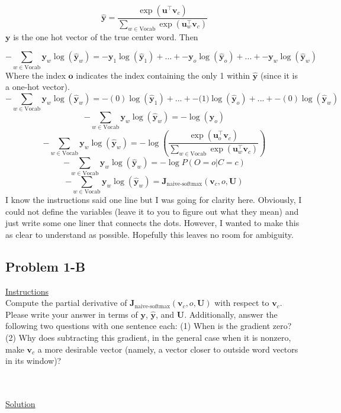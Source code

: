 \documentclass[12pt]{article}
\begin{document}
\begin{equation*}
    \hat{\bm y} = 
    \frac{\exp(\bm u^\top \bm v_c)}{\sum_{w \in \text{Vocab}} \exp(\bm u_{w}^\top \bm v_c)}
\end{equation*}
$\bm y$ is the one hot vector of the true center word. Then

\begin{equation*} 
    -\sum_{w \in \text{Vocab}} \bm y_w \log(\hat{\bm y}_w) = 
    \bm -\bm y_1 \log(\hat{\bm y}_1) + ... + -\bm y_o \log(\hat{\bm y}_o) + ... + -\bm y_w \log(\hat{\bm y}_w)
\end{equation*}    
Where the index $\bm o$ indicates the index containing the only 1 within $\hat {\bm y}$ (since it is a one-hot vector). 
\begin{equation*} 
    -\sum_{w \in \text{Vocab}} \bm y_w \log(\hat{\bm y}_w) = 
    \bm - (0)\log(\hat{\bm y}_1) + ... + -\bm (1) \log(\hat{\bm y}_o) + ... + - (0) \log(\hat{\bm y}_w)
\end{equation*}    
\begin{equation*} 
    -\sum_{w \in \text{Vocab}} \bm y_w \log(\hat{\bm y}_w) = 
    -\log(\hat{\bm y}_o)
\end{equation*}    
\begin{equation*} 
    -\sum_{w \in \text{Vocab}} \bm y_w \log(\hat{\bm y}_w) = 
    - \log(\frac{\exp(\bm u_o^\top \bm v_c)}{\sum_{w \in \text{Vocab}} \exp(\bm u_{w}^\top \bm v_c)})
\end{equation*}    
\begin{equation*} 
    -\sum_{w \in \text{Vocab}} \bm y_w \log(\hat{\bm y}_w) = 
    - \log P(O=o| C=c)
\end{equation*}   
\begin{equation*} 
    -\sum_{w \in \text{Vocab}} \bm y_w \log(\hat{\bm y}_w) = 
    \bm J_{\text{naive-softmax}}(\bm v_c, o, \bm U)
\end{equation*}     
I know the instructions said one line but I was going for clarity here. Obviously, I could not define
the variables (leave it to you to figure out what they mean) and just write some 
one liner that connects the dots. However, I wanted to make this as clear to understand as possible. 
Hopefully this leaves no room for ambiguity. 

\subsection{Problem 1-B}
\underline{Instructions}
~\\
Compute the partial derivative of $\bm J_{\text{naive-softmax}}(\bm v_c, o, \bm U)$ with respect to $\bm v_c$. 
Please write your answer in terms of $\bm y$, $\hat{\bm y}$, and $\bm U$. Additionally, answer the following 
two questions with one sentence each: (1) When is the gradient zero? (2) Why does subtracting this gradient, 
in the general case when it is nonzero, make $\bm v_c$ a more desirable vector (namely, a vector closer to 
outside word vectors in its window)?

~\\
~\\
\underline{Solution}
~\\
\end{document}
